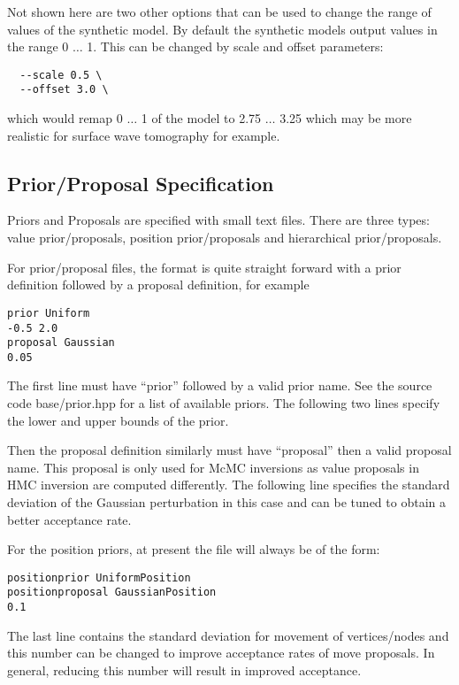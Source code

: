 \documentclass[a4paper,12pt]{article}
\begin{document}
Not shown here are two other options that can be used to change the
range of values of the synthetic model. By default the synthetic
models output values in the range 0 $\ldots$ 1. This can be changed by
scale and offset parameters:

\begin{verbatim}
  --scale 0.5 \
  --offset 3.0 \
\end{verbatim}

which would remap 0 $\ldots$ 1 of the model to 2.75 $\ldots$ 3.25 which may be more
realistic for surface wave tomography for example.

\subsection{Prior/Proposal Specification}

Priors and Proposals are specified with small text files. There are three
types: value prior/proposals, position prior/proposals and hierarchical
prior/proposals.

For prior/proposal files, the format is quite straight forward with
a prior definition followed by a proposal definition, for example

\begin{verbatim}
prior Uniform
-0.5 2.0
proposal Gaussian
0.05
\end{verbatim}

The first line must have ``prior'' followed by a valid prior name. See
the source code base/prior.hpp for a list of available priors. The
following two lines specify the lower and upper bounds of the prior.

Then the proposal definition similarly must have ``proposal'' then a
valid proposal name. This proposal is only used for McMC inversions as
value proposals in HMC inversion are computed differently. The
following line specifies the standard deviation of the Gaussian
perturbation in this case and can be tuned to obtain a better
acceptance rate.

For the position priors, at present the file will always be of the
form:

\begin{verbatim}
positionprior UniformPosition
positionproposal GaussianPosition
0.1
\end{verbatim}

The last line contains the standard deviation for movement of vertices/nodes
and this number can be changed to improve acceptance rates of move proposals.
In general, reducing this number will result in improved acceptance.
\end{document}
